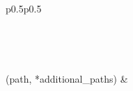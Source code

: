 \documentclass[letterpaper,10pt,english]{sphinxmanual}
\begin{document}
\begin{savenotes}\sphinxatlongtablestart\begin{longtable}[c]{p{0.5\linewidth}p{0.5\linewidth}}
\hline

\endfirsthead

%
{}\\
\hline

\endhead

\hline
{}\\
\endfoot

\endlastfoot

{\hyperref[\detokenize{autoapi/pine/backend/data/service/index:pine.backend.data.service._standardize_path}]{}}(path, *additional\_paths)
&


\end{longtable}
\end{savenotes}
\end{document}
